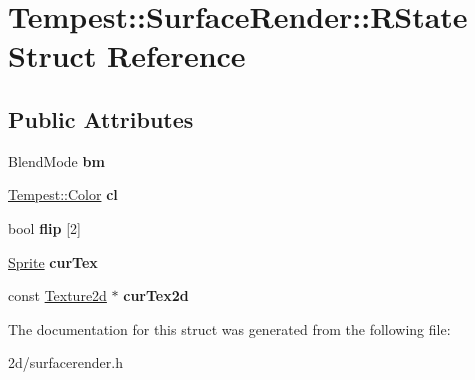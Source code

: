 \hypertarget{struct_tempest_1_1_surface_render_1_1_r_state}{\section{Tempest\+:\+:Surface\+Render\+:\+:R\+State Struct Reference}
\label{struct_tempest_1_1_surface_render_1_1_r_state}
}
\subsection*{Public Attributes}
\begin{DoxyCompactItemize}
\item 
\hypertarget{struct_tempest_1_1_surface_render_1_1_r_state_a1109ba484e660404df1752bed8051875}{Blend\+Mode {\bfseries bm}}\label{struct_tempest_1_1_surface_render_1_1_r_state_a1109ba484e660404df1752bed8051875}

\item 
\hypertarget{struct_tempest_1_1_surface_render_1_1_r_state_aca51aa9696ee2bacacc3501fe9be39b1}{\hyperlink{class_tempest_1_1_color}{Tempest\+::\+Color} {\bfseries cl}}\label{struct_tempest_1_1_surface_render_1_1_r_state_aca51aa9696ee2bacacc3501fe9be39b1}

\item 
\hypertarget{struct_tempest_1_1_surface_render_1_1_r_state_a68e8f4963ef6ffd20901b0e2cd6f27d3}{bool {\bfseries flip} \mbox{[}2\mbox{]}}\label{struct_tempest_1_1_surface_render_1_1_r_state_a68e8f4963ef6ffd20901b0e2cd6f27d3}

\item 
\hypertarget{struct_tempest_1_1_surface_render_1_1_r_state_a5d468fd3f73f4badf53197024ad1e631}{\hyperlink{class_tempest_1_1_sprite}{Sprite} {\bfseries cur\+Tex}}\label{struct_tempest_1_1_surface_render_1_1_r_state_a5d468fd3f73f4badf53197024ad1e631}

\item 
\hypertarget{struct_tempest_1_1_surface_render_1_1_r_state_ac3cc62ace036feb8d482163b5b41f401}{const \hyperlink{class_tempest_1_1_texture2d}{Texture2d} $\ast$ {\bfseries cur\+Tex2d}}\label{struct_tempest_1_1_surface_render_1_1_r_state_ac3cc62ace036feb8d482163b5b41f401}

\end{DoxyCompactItemize}


The documentation for this struct was generated from the following file\+:\begin{DoxyCompactItemize}
\item 
2d/surfacerender.\+h\end{DoxyCompactItemize}
